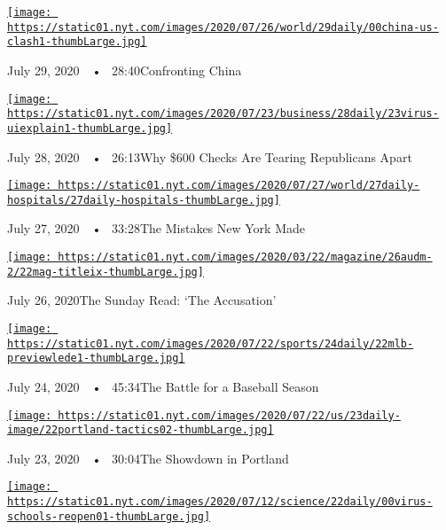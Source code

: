 \href{https://www.nytimes.com/2020/07/29/podcasts/the-daily/china-trump-foreign-policy.html?action=click\&module=audio-series-bar\&region=header\&pgtype=Article}{\texttt{[image: https://static01.nyt.com/images/2020/07/26/world/29daily/00china-us-clash1-thumbLarge.jpg]}}

July 29, 2020~~•~ 28:40Confronting China

\href{https://www.nytimes.com/2020/07/28/podcasts/the-daily/unemployment-benefits-coronavirus.html?action=click\&module=audio-series-bar\&region=header\&pgtype=Article}{\texttt{[image: https://static01.nyt.com/images/2020/07/23/business/28daily/23virus-uiexplain1-thumbLarge.jpg]}}

July 28, 2020~~•~ 26:13Why \$600 Checks Are Tearing Republicans Apart

\href{https://www.nytimes.com/2020/07/27/podcasts/the-daily/new-york-hospitals-covid.html?action=click\&module=audio-series-bar\&region=header\&pgtype=Article}{\texttt{[image: https://static01.nyt.com/images/2020/07/27/world/27daily-hospitals/27daily-hospitals-thumbLarge.jpg]}}

July 27, 2020~~•~ 33:28The Mistakes New York Made

\href{https://www.nytimes.com/2020/07/26/podcasts/the-daily/the-accusation-the-sunday-read.html?action=click\&module=audio-series-bar\&region=header\&pgtype=Article}{\texttt{[image: https://static01.nyt.com/images/2020/03/22/magazine/26audm-2/22mag-titleix-thumbLarge.jpg]}}

July 26, 2020The Sunday Read: `The Accusation'

\href{https://www.nytimes.com/2020/07/24/podcasts/the-daily/mlb-baseball-season-coronavirus.html?action=click\&module=audio-series-bar\&region=header\&pgtype=Article}{\texttt{[image: https://static01.nyt.com/images/2020/07/22/sports/24daily/22mlb-previewlede1-thumbLarge.jpg]}}

July 24, 2020~~•~ 45:34The Battle for a Baseball Season

\href{https://www.nytimes.com/2020/07/23/podcasts/the-daily/portland-protests.html?action=click\&module=audio-series-bar\&region=header\&pgtype=Article}{\texttt{[image: https://static01.nyt.com/images/2020/07/22/us/23daily-image/22portland-tactics02-thumbLarge.jpg]}}

July 23, 2020~~•~ 30:04The Showdown in Portland

\href{https://www.nytimes.com/2020/07/22/podcasts/the-daily/school-reopenings-coronavirus.html?action=click\&module=audio-series-bar\&region=header\&pgtype=Article}{\texttt{[image: https://static01.nyt.com/images/2020/07/12/science/22daily/00virus-schools-reopen01-thumbLarge.jpg]}}

